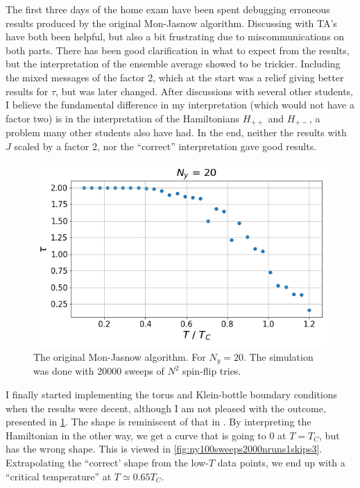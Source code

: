 \documentclass[11pt,a4paper,twocolumn]{article}
\begin{document}
The first three days of the home exam have been spent debugging erroneous results produced by the original Mon-Jasnow algorithm. Discussing with TA's have both been helpful, but also a bit frustrating due to miscommunications on both parts. There has been good clarification in what to expect from the results, but the interpretation of the ensemble average showed to be trickier. 
Including the mixed messages of the factor 2, which at the start was a relief giving better results for $\tau$, but was later changed. After discussions with several other students, I believe the fundamental difference in my interpretation (which would not have a factor two) is in the interpretation of the Hamiltonians $H_{++}$ and $H_{+-}$, a problem many other students also have had. 
In the end, neither the results with $J$ scaled by a factor 2, nor the ``correct'' interpretation gave good results. 
\begin{figure}
	\centering
	\includegraphics[width=\linewidth]{img/Ny20_Sweeps20000_Nruns1_Skips3_Nsteps30}
	\caption{The original Mon-Jasnow algorithm. For $N_y = 20$. The simulation was done with 20000 sweeps of $N^2$ spin-flip tries.}
	\label{fig:ny20sweeps20000nruns1skips3nsteps30}
\end{figure}
I finally started implementing the torus and Klein-bottle boundary conditions when the results were decent, although I am not pleased with the outcome, presented in \cref{fig:ny20sweeps20000nruns1skips3nsteps30}.
The shape is reminiscent of that in . By interpreting the Hamiltonian in the other way, we get a curve that is going to 0 at $T = T_C$, but has the wrong shape. This is viewed in \cref{fig:ny100sweeps2000nruns1skips3}. Extrapolating the ``correct' shape from the low-$T$ data points, we end up with a ``critical temperature'' at $T \simeq 0.65T_C$. 
\end{document}
